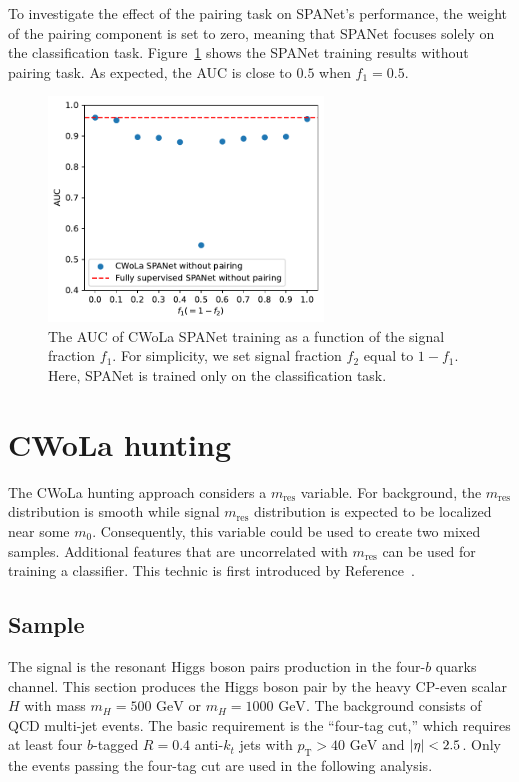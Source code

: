 \documentclass[12pt]{article}
\begin{document}
        To investigate the effect of the pairing task on SPANet's performance, the weight of the pairing component is set to zero, meaning that SPANet focuses solely on the classification task. Figure~\ref{fig:CWoLa_SPANet_without_pairing} shows the SPANet training results without pairing task. As expected, the AUC is close to $0.5$ when $f_1 = 0.5$.
        \begin{figure}[htpb]
            \centering
            \includegraphics[width=0.65\textwidth]{CWoLa_SPANet_no_pair.pdf}
            \caption{The AUC of CWoLa SPANet training as a function of the signal fraction $f_1$. For simplicity, we set signal fraction $f_2$ equal to $1 - f_1$. Here, SPANet is trained only on the classification task.}
            \label{fig:CWoLa_SPANet_without_pairing}
        \end{figure}

\section{CWoLa hunting}%
\label{sec:cwola_hunting}
    The CWoLa hunting approach considers a $m_{\text{res}}$ variable. For background, the $m_{\text{res}}$ distribution is smooth while signal $m_{\text{res}}$ distribution is expected to be localized near some $m_0$. Consequently, this variable could be used to create two mixed samples. Additional features that are uncorrelated with $m_{\text{res}}$ can be used for training a classifier. This technic is first introduced by Reference~\cite{Collins:2018epr}.
    \subsection{Sample}%
    \label{sub:sample_cwola_hunting}
        The signal is the resonant Higgs boson pairs production in the four-$b$ quarks channel. This section produces the Higgs boson pair by the heavy CP-even scalar $H$ with mass $m_H = \text{500 GeV}$ or $m_H = \text{1000 GeV}$. The background consists of QCD multi-jet events. The basic requirement is the ``four-tag cut,'' which requires at least four $b$-tagged $R = 0.4$ anti-$k_t$ jets with $p_\text{T} > \text{40 GeV}$ and $\abs{\eta} < 2.5$. Only the events passing the four-tag cut are used in the following analysis.
\end{document}
